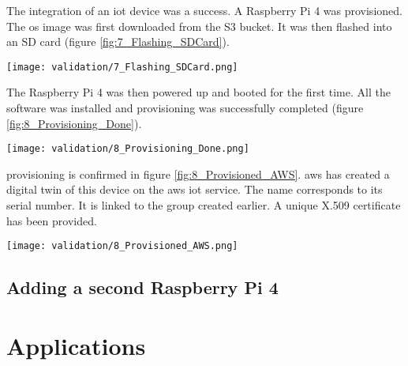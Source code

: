 The integration of an \acrshort{iot} device was a success. A Raspberry Pi 4 was provisioned. The \acrshort{os} image was first downloaded from the S3 bucket. It was then flashed into an SD card (figure \ref{fig:7_Flashing_SDCard}).
\begin{center}
    \begingroup
    \texttt{[image: validation/7\_Flashing\_SDCard.png]}
    \label{fig:7_Flashing_SDCard}
    \endgroup
\end{center}
The Raspberry Pi 4 was then powered up and booted for the first time. All the software was installed and \gls{provisioning} was successfully completed (figure \ref{fig:8_Provisioning_Done}).
\begin{center}
    \begingroup
    \texttt{[image: validation/8\_Provisioning\_Done.png]}
    \label{fig:8_Provisioning_Done}
    \endgroup
\end{center}
\Gls{provisioning} is confirmed in figure \ref{fig:8_Provisioned_AWS}. \gls{aws} has created a digital twin of this device on the \gls{aws} \acrshort{iot} service. The name corresponds to its serial number. It is linked to the group created earlier. A unique X.509 certificate has been provided.
\begin{center}
    \begingroup
    \texttt{[image: validation/8\_Provisioned\_AWS.png]}
    \label{fig:8_Provisioned_AWS}
    \endgroup
\end{center}

\subsection{Adding a second Raspberry Pi 4}

\section{Applications}

